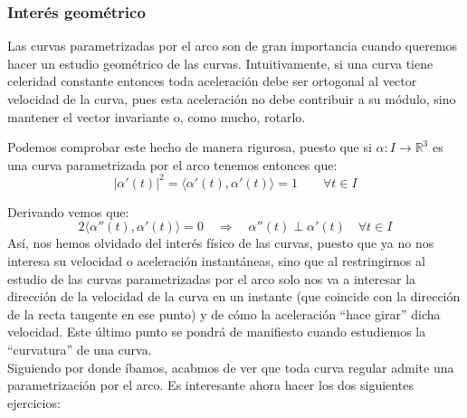 \subsubsection{Interés geométrico}
\noindent
Las curvas parametrizadas por el arco son de gran importancia cuando queremos hacer un estudio geométrico de las curvas. Intuitivamente, si una curva tiene celeridad constante entonces toda aceleración debe ser ortogonal al vector velocidad de la curva, pues esta aceleración no debe contribuir a su módulo, sino mantener el vector invariante o, como mucho, rotarlo. 

Podemos comprobar este hecho de manera rigurosa, puesto que si $\alpha:I\to\mathbb{R}^3$ es una curva parametrizada por el arco tenemos entonces que:
\begin{equation*}
    |\alpha'(t)|^2 = \langle \alpha'(t),\alpha'(t) \rangle = 1 \qquad \forall t\in I
\end{equation*}

Derivando vemos que:
\begin{equation*}
    2\langle \alpha''(t), \alpha'(t) \rangle = 0  \quad\Longrightarrow\quad \alpha''(t) \perp \alpha'(t) \quad \forall t\in I
\end{equation*}
Así, nos hemos olvidado del interés físico de las curvas, puesto que ya no nos interesa su velocidad o aceleración instantáneas, sino que al restringirnos al estudio de las curvas parametrizadas por el arco solo nos va a interesar la dirección de la velocidad de la curva en un instante (que coincide con la dirección de la recta tangente en ese punto) y de cómo la aceleración ``hace girar'' dicha velocidad. Este último punto se pondrá de manifiesto cuando estudiemos la ``curvatura'' de una curva.\\

\noindent
Siguiendo por donde íbamos, acabmos de ver que toda curva regular admite una parametrización por el arco. Es interesante ahora hacer los dos siguientes ejercicios:

